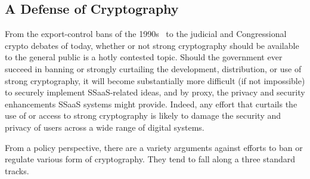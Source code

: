 \subsection{A Defense of Cryptography}

From the export-control bans of the 1990s~\cite{kehl2015} to the
judicial and Congressional crypto debates of today, whether or not
strong cryptography should be available to the general public is a
hotly contested topic. Should the government ever succeed in banning
or strongly curtailing the development, distribution, or use of strong
cryptography, it will become substantially more difficult (if not
impossible) to securely implement SSaaS-related ideas, and by proxy,
the privacy and security enhancements SSaaS systems might
provide. Indeed, any effort that curtails the use of or access to
strong cryptography is likely to damage the security and privacy of
users across a wide range of digital systems.

From a policy perspective, there are a variety arguments against
efforts to ban or regulate various form of cryptography. They tend to
fall along a three standard tracks.

